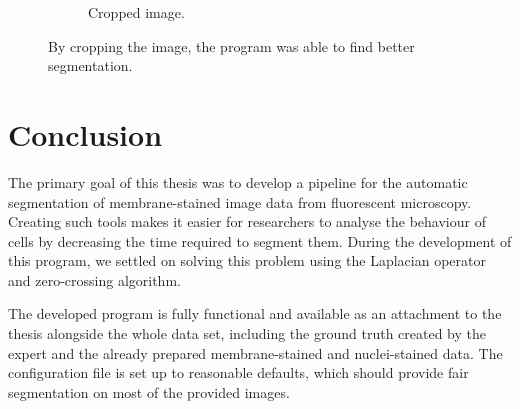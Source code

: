 \documentclass[
  digital,     %
  oneside,     %
  nosansbold,  %
  nocolorbold, %
  lof,         %
  lot,         %
]{fithesis4}
\begin{document}
\begin{figure}
\begin{subfigure}[t]{0.3\textwidth}
        \caption{Cropped image.}
    \end{subfigure}
    \caption{By cropping the image, the program was able to find better segmentation.}
    \label{fig:issues-cropping}
\end{figure}

\chapter{Conclusion}

The primary goal of this thesis was to develop a pipeline for the automatic segmentation of membrane-stained image data from fluorescent microscopy. Creating such tools makes it easier for researchers to analyse the behaviour of cells by decreasing the time required to segment them. During the development of this program, we settled on solving this problem using the Laplacian operator and zero-crossing algorithm.

The developed program is fully functional and available as an attachment to the thesis alongside the whole data set, including the ground truth
created by the expert and the already prepared membrane-stained and nuclei-stained data. The configuration file is set up to reasonable defaults, which should provide fair segmentation on most of the provided images.
\end{document}
